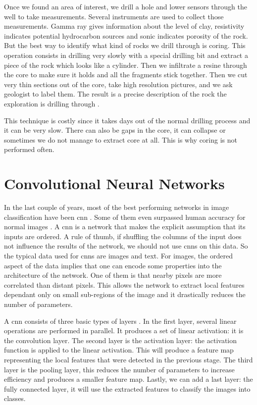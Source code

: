 Once we found an area of interest, we drill a hole and lower sensors through the well to take measurements. Several instruments are used to collect those measurements.  Gamma ray gives information about the level of clay, resistivity indicates potential hydrocarbon sources and sonic indicates porosity of the rock. But the best way to identify what kind of rocks we drill through is coring. This operation consists in drilling very slowly with a special drilling bit and extract a piece of the rock which looks like a cylinder. Then we infiltrate a resine through the core to make sure it holds and all the fragments stick together. Then we cut very thin sections out of the core, take high resolution pictures, and we ask geologist to label them. The result is a precise description of the rock the exploration is drilling through \cite{oilbegin}.  

This technique is costly since it takes days out of the normal drilling process and it can be very slow. There can also be gaps in the core, it can collapse or sometimes we do not manage to extract core at all. This is why coring is not performed often. 

\section{Convolutional Neural Networks}
In the last couple of years, most of the best performing networks in image classification have been \gls{cnn} \cite{resnetpaper, alexpaper, googlepaper}. Some of them even surpassed human accuracy for normal images \cite{humanDNN}.
A \gls{cnn} is a network that makes the explicit assumption that its inputs are ordered. A rule of thumb, if shuffling the columns of the input does not influence the results of the network, we should not use \gls{cnn}s on this data. So the typical data used for \gls{cnn}s are images and text. 
For images, the ordered aspect of the data implies that one can encode some properties into the architecture of the network. One of them is that nearby pixels are more correlated than distant pixels. This allows the network to extract local features dependant only on small sub-regions of the image and it drastically reduces the number of parameters. 


A \gls{cnn} consists of three basic types of layers \cite{deepbook}.  In the first layer, several linear operations are performed in parallel. It produces a set of linear activation: it is the convolution layer. The second layer is the activation layer: the activation function is applied to the linear activation. This will produce a feature map representing the local features that were detected in the previous stage. The third layer is the pooling layer, this reduces the number of parameters to increase efficiency and produces a smaller feature map. Lastly, we can add a last layer: the fully connected layer, it will use the extracted features to classify the images into classes.


